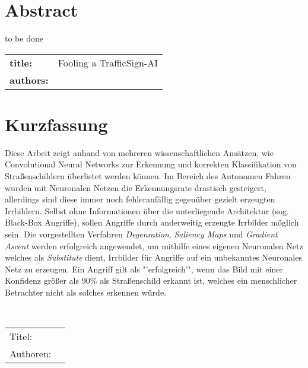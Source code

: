 \chapter*{Abstract} %
to be done
~\newline
~\newline
\begin{flushleft}
	\begin{tabular}{lp{11cm}}
		\textbf{title:} & Fooling a TrafficSign-AI \\
		\textbf{authors:}  & \autor \\
		
	\end{tabular} 
\end{flushleft}


\chapter*{Kurzfassung} 
Diese Arbeit zeigt anhand von mehreren wissenschaftlichen Ansätzen, wie Convolutional Neural Networks zur Erkennung und korrekten Klassifikation von Straßenschildern überlistet werden können.
Im Bereich des Autonomen Fahren wurden mit Neuronalen Netzen die Erkennungsrate drastisch gesteigert, allerdings sind diese immer noch fehleranfällig gegenüber gezielt erzeugten Irrbildern. Selbst ohne Informationen über die unterliegende Architektur (sog. Black-Box Angriffe), sollen Angriffe durch anderweitig erzeugte Irrbilder möglich sein.
Die vorgestellten Verfahren \textit{Degenration}, \textit{Saliency Maps} und \textit{Gradient Ascent} werden erfolgreich angewendet, um mithilfe eines eigenen Neuronalen Netz welches als \textit{Substitute} dient, Irrbilder für Angriffe auf ein unbekanntes Neuronales Netz zu erzeugen.
Ein Angriff gilt als "'erfolgreich'", wenn das Bild mit einer Konfidenz größer als 90\% als Straßenschild erkannt ist, welches ein menschlicher Betrachter nicht als solches erkennen würde.

~\newline
\begin{flushleft}
	\begin{tabular}{lp{11cm}}
		Titel:&  \titel \\ 
		Authoren:&  \autor \\
	\end{tabular} 
\end{flushleft}
